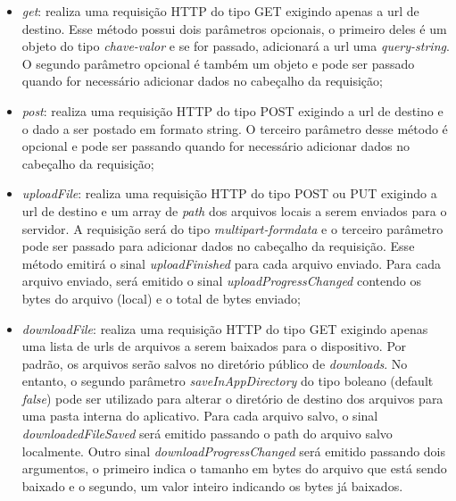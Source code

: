 \begin{itemize}
	\item \textit{get}: realiza uma requisição HTTP do tipo GET exigindo apenas a url de destino. Esse método possui dois parâmetros opcionais, o primeiro deles é um objeto do tipo \textit{chave-valor} e se for passado, adicionará a url uma \textit{query-string}. O segundo parâmetro opcional é também um objeto e pode ser passado quando for necessário adicionar dados no cabeçalho da requisição;

	\item \textit{post}: realiza uma requisição HTTP do tipo POST exigindo a url de destino e o dado a ser postado em formato string. O terceiro parâmetro desse método é opcional e pode ser passando quando for necessário adicionar dados no cabeçalho da requisição;

	\item \textit{uploadFile}: realiza uma requisição HTTP do tipo POST ou PUT exigindo a url de destino e um array de \textit{path} dos arquivos locais a serem enviados para o servidor. A requisição será do tipo \textit{multipart-formdata} e o terceiro parâmetro pode ser passado para adicionar dados no cabeçalho da requisição. Esse método emitirá o sinal \textit{uploadFinished} para cada arquivo enviado. Para cada arquivo enviado, será emitido o sinal \textit{uploadProgressChanged} contendo os bytes do arquivo (local) e o total de bytes enviado;

	\item \textit{downloadFile}: realiza uma requisição HTTP do tipo GET exigindo apenas uma lista de urls de arquivos a serem baixados para o dispositivo. Por padrão, os arquivos serão salvos no diretório público de \textit{downloads}. No entanto, o segundo parâmetro \textit{saveInAppDirectory} do tipo boleano (default \textit{false}) pode ser utilizado para alterar o diretório de destino dos arquivos para uma pasta interna do aplicativo. Para cada arquivo salvo, o sinal \textit{downloadedFileSaved} será emitido passando o path do arquivo salvo localmente. Outro sinal \textit{downloadProgressChanged} será emitido passando dois argumentos, o primeiro indica o tamanho em bytes do arquivo que está sendo baixado e o segundo, um valor inteiro indicando os bytes já baixados.
\end{itemize}

